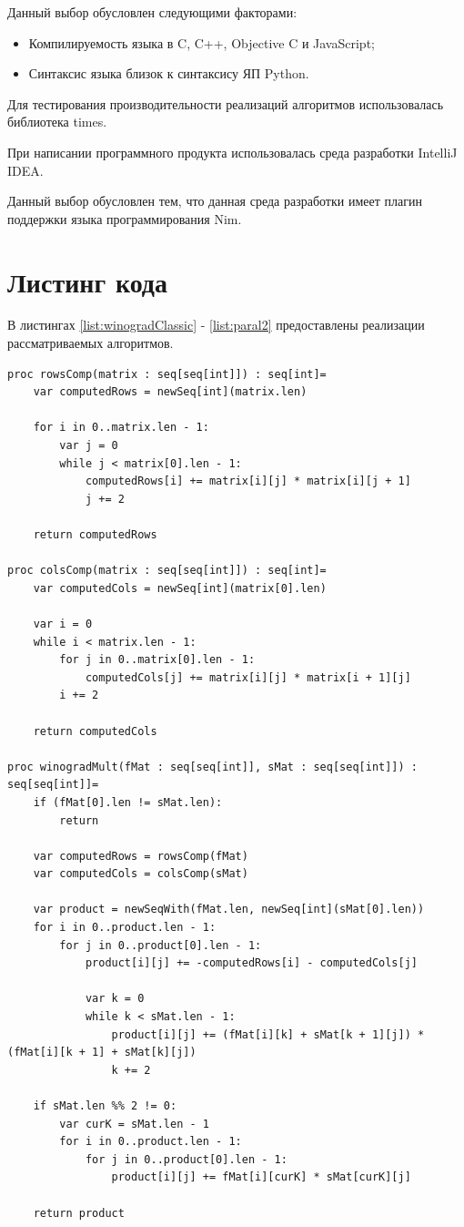 \documentclass[12pt]{report}
\begin{document}
Данный выбор обусловлен следующими факторами:
\begin{itemize}
\item Компилируемость языка в C, C++, Objective C и JavaScript;
\item Синтаксис языка близок к синтаксису ЯП Python.
\end{itemize}

Для тестирования производительности реализаций алгоритмов использовалась библиотека times.

При написании программного продукта использовалась среда разработки IntelliJ IDEA.

Данный выбор обусловлен тем, что данная среда разработки имеет плагин поддержки языка программирования Nim.

\section{Листинг кода}
В листингах \ref{list:winogradClassic} - \ref{list:paral2} предоставлены реализации рассматриваемых алгоритмов.
\begin{lstlisting}[caption=Алгоритм Капперсмита-Винограда в последовательной реализации,
label={list:winogradClassic}]
proc rowsComp(matrix : seq[seq[int]]) : seq[int]=
    var computedRows = newSeq[int](matrix.len)

    for i in 0..matrix.len - 1:
        var j = 0
        while j < matrix[0].len - 1:
            computedRows[i] += matrix[i][j] * matrix[i][j + 1]
            j += 2

    return computedRows

proc colsComp(matrix : seq[seq[int]]) : seq[int]=
    var computedCols = newSeq[int](matrix[0].len)

    var i = 0
    while i < matrix.len - 1:
        for j in 0..matrix[0].len - 1:
            computedCols[j] += matrix[i][j] * matrix[i + 1][j]
        i += 2

    return computedCols

proc winogradMult(fMat : seq[seq[int]], sMat : seq[seq[int]]) : seq[seq[int]]=
    if (fMat[0].len != sMat.len):
        return

    var computedRows = rowsComp(fMat)
    var computedCols = colsComp(sMat)

    var product = newSeqWith(fMat.len, newSeq[int](sMat[0].len))
    for i in 0..product.len - 1:
        for j in 0..product[0].len - 1:
            product[i][j] += -computedRows[i] - computedCols[j]

            var k = 0
            while k < sMat.len - 1:
                product[i][j] += (fMat[i][k] + sMat[k + 1][j]) * (fMat[i][k + 1] + sMat[k][j])
                k += 2

    if sMat.len %% 2 != 0:
        var curK = sMat.len - 1
        for i in 0..product.len - 1:
            for j in 0..product[0].len - 1:
                product[i][j] += fMat[i][curK] * sMat[curK][j]

    return product
\end{lstlisting}
\end{document}
